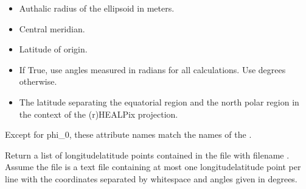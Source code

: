 \documentclass[a4paper,12ptopenany,oneside,english]{sphinxmanual}
\begin{document}
\begin{fulllineitems}
\begin{itemize}
\item {} 
\sphinxAtStartPar
{} \sphinxhyphen{} Authalic radius of the ellipsoid in meters.

\item {} 
\sphinxAtStartPar
{} \sphinxhyphen{} Central meridian.

\item {} 
\sphinxAtStartPar
{} \sphinxhyphen{} Latitude of origin.

\item {} 
\sphinxAtStartPar
{} \sphinxhyphen{} If True, use angles measured in radians for all calculations.
Use degrees otherwise.

\item {} 
\sphinxAtStartPar
{} \sphinxhyphen{} The latitude separating the equatorial region and
the north polar region in the context of the (r)HEALPix projection.

\end{itemize}

\sphinxAtStartPar
Except for phi\_0, these attribute names match the names of the
.

\begin{fulllineitems}
\label{\detokenize{ellipsoids:rhealpixdggs.ellipsoids.Ellipsoid.get_points}}
\pysigstartsignatures
{}
\pysigstopsignatures
\sphinxAtStartPar
Return a list of longitude\sphinxhyphen{}latitude points contained in
the file with filename .
Assume the file is a text file containing at most one
longitude\sphinxhyphen{}latitude point per line with the coordinates separated by
whitespace and angles given in degrees.

\end{fulllineitems}



\end{fulllineitems}
\end{document}
